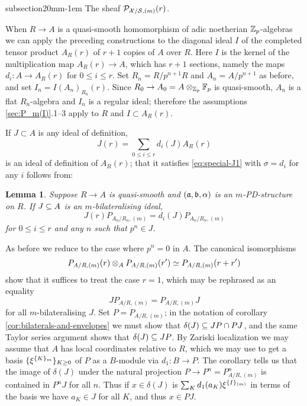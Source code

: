 \documentclass{article}
\makeatletter
\theoremstyle{change}
\newtheorem{lemma}[subsubsection]{Lemma}
\renewcommand{\subsection}{\@startsection%
{subsection}{2}{0mm}{\baselineskip}{-1em}%
{\normalfont\normalsize\bfseries}}
\numberwithin{equation}{subsubsection}
\newcommand{\demobox}{\vrule height6pt width6pt depth0pt}
\newenvironment{demo}{\noindent{\it Proof.}}
{{\unskip\nobreak\hfil\qquad
\demobox\parfillskip=0pt\par}
\medskip}
\makeatother
\begin{document}
\subsection{The sheaf ${\cal P}_{{\cal X}/{\cal S},(m)}(r)$.}
\label{sec:P_X/S,m}

When $R\to A$ is a quasi-smooth homomorphism of adic noetherian
${\mathbb Z}_p$-algebras we can apply the preceding constructions to the
diagonal ideal $I$ of the completed tensor product $A_R(r)$ of $r+1$
copies of $A$ over $R$. Here $I$ is the kernel of the multiplication
map $A_R(r)\to A$, which has $r+1$ sections, namely the maps
$d_i:A\to A_R(r)$ for $0\le i\le r$. Set $R_n=R/p^{n+1}R$ and
$A_n=A/p^{n+1}$ as before, and set $I_n=I(A_n)_{R_n}(r)$. Since
$R_0\to A_0=A\otimes_{{\mathbb Z}_p}{\mathbb{F}}_p$ is quasi-smooth, $A_n$ is a flat
$R_n$-algebra and $I_n$ is a regular ideal; therefore the assumptions
\ref{sec:P_m(I)}.1--3 apply to $R$ and $I\subset A_R(r)$.

If $J\subset A$ is any ideal of definition, 
\begin{equation}
  \label{eq:Jr-A}
  J(r)=\sum_{0\le i\le r}d_i(J)A_R(r)
\end{equation}
is an ideal of definition of $A_R(r)$; that it satisfies
\ref{eq:special-J1} with $\sigma=d_i$ for any $i$ follows from:

\begin{lemma}\label{lemma:bilaterals-and-envelopes}
  Suppose $R\to A$ is quasi-smooth and $({\mathfrak a},{\mathfrak b},\alpha)$ is an
  $m$-PD-structure on $R$. If $J\subseteq A$ is an $m$-bilateralising
  ideal,
  \begin{displaymath}
    J(r) P_{A_n/R_n,(m)}=d_i(J) P_{A_n/R_n,(m)}
  \end{displaymath}
  for $0\le i\le r$ and any $n$ such that $p^n\in J$.
\end{lemma}
\begin{demo}
  As before we reduce to the case where $p^n=0$ in $A$. 
  The canonical isomorphisms
  \begin{displaymath}
    P_{A/R,(m)}(r)\otimes_A P_{A/R,(m)}(r')
    \simeq P_{A/R,(m)}(r+r')
  \end{displaymath}
  show that it suffices to treat the case $r=1$, which may be
  rephrased as an equality
  \begin{equation}
    \label{eq:J2}
    JP_{A/R,(m)}=P_{A/R,(m)}J
  \end{equation}
  for all $m$-bilateralising $J$. Set $P=P_{A/R,(m)}$; in the notation
  of corollary \ref{cor:bilaterals-and-envelopes} we must show that
  $\delta(J)\subseteq JP\cap PJ$, and the same Taylor series argument
  shows that $\delta(J)\subseteq JP$. By Zariski localization we may
  assume that $A$ has local coordinates relative to $R$, which we may
  use to get a basis $\{{\xi}^{\{{K}\}_{m}}\}_{K\ge0}$ of $P$ as a
  $B$-module via $d_1:B\to P$. The corollary tells us that the image
  of $\delta(J)$ under the natural projection $P\to P^n=P^n_{A/R,(m)}$
  is contained in $P^nJ$ for all $n$. Thus if $x\in\delta(J)$ is
  $\sum_Kd_1(a_K){\xi}^{\{{I}\}_{(m)}}$ in terms of the basis we have
  $a_K\in J$ for all $K$, and thus $x\in PJ$.
\end{demo}
\end{document}
